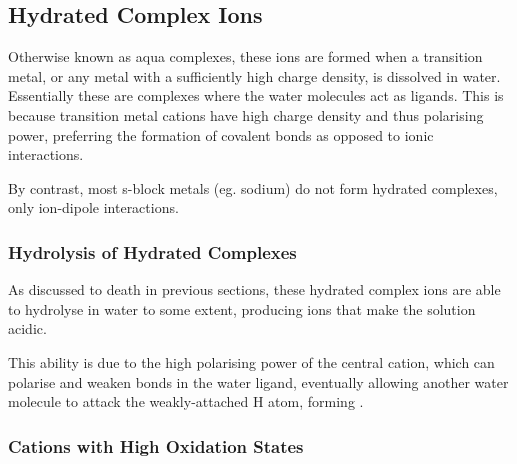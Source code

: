 


		\subsection{Hydrated Complex Ions}

			Otherwise known as aqua complexes, these ions are formed when a transition metal, or any metal with a sufficiently high charge
			density, is dissolved in water. Essentially these are complexes where the water molecules act as ligands. This is because
			transition metal cations have high charge density and thus polarising power, preferring the formation of covalent bonds as
			opposed to ionic interactions.

			By contrast, most s-block metals (eg. sodium) do not form hydrated complexes, only ion-dipole interactions.


			\pagebreak
			\subsubsection{Hydrolysis of Hydrated Complexes}

				As discussed to death in previous sections, these hydrated complex ions are able to hydrolyse in water to some extent, producing
				 ions that make the solution acidic.

				This ability is due to the high polarising power of the central cation, which can polarise and weaken  bonds in the
				water ligand, eventually allowing another water molecule to attack the weakly-attached H atom, forming .




			\subsubsection{Cations with High Oxidation States}

